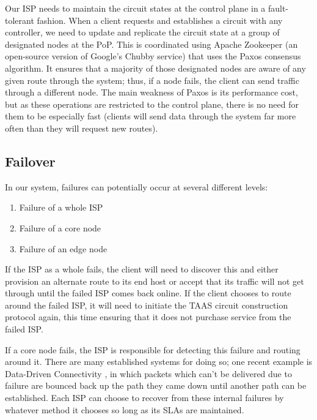 \documentclass{article}
\begin{document}
Our ISP needs to maintain the circuit states at the control plane in a
fault-tolerant fashion. When a client requests and establishes a
circuit with any controller, we need to update and replicate the
circuit state at a group of designated nodes at the PoP. This is
coordinated using Apache Zookeeper (an open-source version of Google's
Chubby service) that uses the Paxos consensus algorithm. It ensures
that a majority of those designated nodes are aware of any given route
through the system; thus, if a node fails, the client can send traffic
through a different node. The main weakness of Paxos is its
performance cost, but as these operations are restricted to the
control plane, there is no need for them to be especially fast
(clients will send data through the system far more often than they
will request new routes).

\subsection{Failover}

In our system, failures can potentially occur at several different
levels:

\begin{enumerate}
\item Failure of a whole ISP
\item Failure of a core node
\item Failure of an edge node
\end{enumerate}

If the ISP as a whole fails, the client will need to discover this and
either provision an alternate route to its end host or accept that its
traffic will not get through until the failed ISP comes back
online. If the client chooses to route around the failed ISP, it will
need to initiate the TAAS circuit construction protocol again, this
time ensuring that it does not purchase service from the failed ISP.

If a core node fails, the ISP is responsible for detecting this
failure and routing around it. There are many established systems for
doing so; one recent example is Data-Driven Connectivity \cite{ddc},
in which packets which can't be delivered due to failure are bounced
back up the path they came down until another path can be
established. Each ISP can choose to recover from these internal
failures by whatever method it chooses so long as its SLAs are
maintained.
\end{document}
